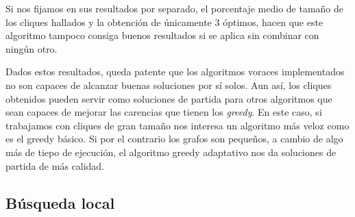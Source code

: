Si nos fijamos en sus resultados por separado, el porcentaje medio de tamaño de los
cliques hallados y la obtención de únicamente $3$ óptimos, hacen que este algoritmo
tampoco consiga buenos resultados si se aplica sin combinar con ningún otro.

Dados estos resultados, queda patente que los algoritmos voraces implementados no
son capaces de alcanzar buenas soluciones por sí solos. Aun así, los cliques
obtenidos pueden servir como soluciones de partida para otros algoritmos que sean
capaces de mejorar las carencias que tienen los \textit{greedy}. En este caso,
si trabajamos con cliques de gran tamaño nos interesa un algoritmo más veloz como
es el greedy básico. Si por el contrario los grafos son pequeños, a cambio de algo
más de tiepo de ejecución, el algoritmo greedy adaptativo nos da soluciones de
partida de más calidad.

\subsection{Búsqueda local}

